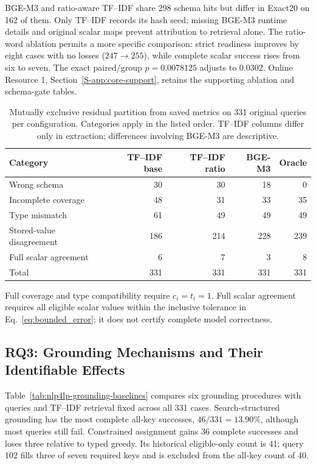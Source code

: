 \documentclass[pdflatex,iicol,sn-basic,Numbered]{sn-jnl}
\begin{document}
BGE-M3 and ratio-aware TF--IDF share 298 schema hits but differ in Exact20 on 162 of them. Only TF--IDF records its hash seed; missing BGE-M3 runtime details and original scalar maps prevent attribution to retrieval alone. The ratio-word ablation permits a more specific comparison: strict readiness improves by eight cases with no losses ($247\to255$), while complete scalar success rises from six to seven. The exact paired/group $p=0.0078125$ adjusts to $0.0302$. Online Resource 1, Section~\ref{S-app:core-support}, retains the supporting ablation and schema-gate tables.

\begin{table}[t]
  \centering
  \renewcommand{\arraystretch}{1.18}
  \caption{Mutually exclusive residual partition from saved metrics on 331 original queries per configuration. Categories apply in the listed order. TF--IDF columns differ only in extraction; differences involving BGE-M3 are descriptive.}
  \label{tab:nlp4lp-error-taxonomy}
  \small
  \setlength{\tabcolsep}{4pt}
  \begin{tabular}{@{}lrrrr@{}}
    \toprule
    Category & TF--IDF base & TF--IDF ratio & BGE-M3 & Oracle \\
    \midrule
Wrong schema & 30 & 30 & 18 & 0 \\
Incomplete coverage & 48 & 31 & 33 & 35 \\
Type mismatch & 61 & 49 & 49 & 49 \\
Stored-value disagreement & 186 & 214 & 228 & 239 \\
Full scalar agreement & 6 & 7 & 3 & 8 \\
\midrule
Total & 331 & 331 & 331 & 331 \\
    \bottomrule
  \end{tabular}

  \vspace{2mm}
  \begin{minipage}{\textwidth}
  \small\raggedright
  Full coverage and type compatibility require $c_i=t_i=1$. Full scalar agreement requires all eligible scalar values within the inclusive tolerance in Eq.~\eqref{eq:bounded_error}; it does not certify complete model correctness.
  \end{minipage}
\end{table}

\subsection{RQ3: Grounding Mechanisms and Their Identifiable Effects}
\label{subsec:exp_grounding_baselines}
Table~\ref{tab:nlp4lp-grounding-baselines} compares six grounding procedures with queries and TF--IDF retrieval fixed across all 331 cases. Search-structured grounding has the most complete all-key successes, $46/331=13.90\%$, although most queries still fail. Constrained assignment gains 36 complete successes and loses three relative to typed greedy. Its historical eligible-only count is 41; query 102 fills three of seven required keys and is excluded from the all-key count of 40.
\end{document}
